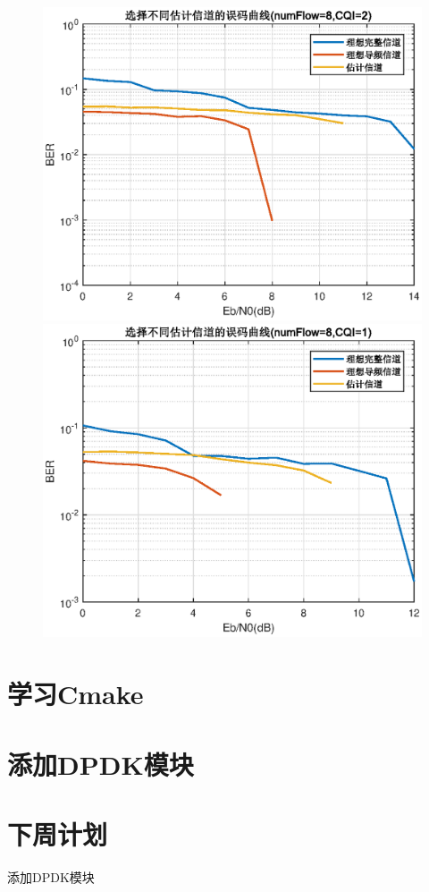 \documentclass{article}
\begin{document}
\begin{figure}[htbp]
	\centering
	\begin{minipage}[t]{0.48\textwidth}
	\centering
	\includegraphics[width=\textwidth]{plot/plot_CQI2.eps}
	\end{minipage}
	\begin{minipage}[t]{0.48\textwidth}
	\centering
	\includegraphics[width=\textwidth]{plot/plot_CQI1.eps}
	\end{minipage}
\end{figure}

\section{学习Cmake}

\section{添加DPDK模块}


\section{下周计划}
添加DPDK模块
\end{document}
